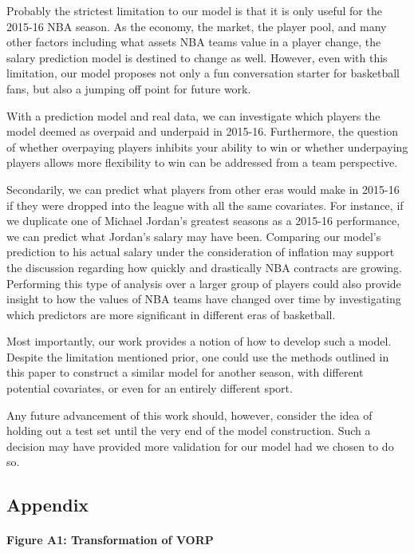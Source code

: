 \documentclass[]{article}
\let\oldparagraph\paragraph
\renewcommand{\paragraph}[1]{\oldparagraph{#1}\mbox{}}
\begin{document}
Probably the strictest limitation to our model is that it is only useful
for the 2015-16 NBA season. As the economy, the market, the player pool,
and many other factors including what assets NBA teams value in a player
change, the salary prediction model is destined to change as well.
However, even with this limitation, our model proposes not only a fun
conversation starter for basketball fans, but also a jumping off point
for future work.

With a prediction model and real data, we can investigate which players
the model deemed as overpaid and underpaid in 2015-16. Furthermore, the
question of whether overpaying players inhibits your ability to win or
whether underpaying players allows more flexibility to win can be
addressed from a team perspective.

Secondarily, we can predict what players from other eras would make in
2015-16 if they were dropped into the league with all the same
covariates. For instance, if we duplicate one of Michael Jordan's
greatest seasons as a 2015-16 performance, we can predict what Jordan's
salary may have been. Comparing our model's prediction to his actual
salary under the consideration of inflation may support the discussion
regarding how quickly and drastically NBA contracts are growing.
Performing this type of analysis over a larger group of players could
also provide insight to how the values of NBA teams have changed over
time by investigating which predictors are more significant in different
eras of basketball.

Most importantly, our work provides a notion of how to develop such a
model. Despite the limitation mentioned prior, one could use the methods
outlined in this paper to construct a similar model for another season,
with different potential covariates, or even for an entirely different
sport.

Any future advancement of this work should, however, consider the idea
of holding out a test set until the very end of the model construction.
Such a decision may have provided more validation for our model had we
chosen to do so.

\newpage

\subsection{Appendix}\label{appendix}

\paragraph{Figure A1: Transformation of
VORP}\label{figure-a1-transformation-of-vorp}
\end{document}
